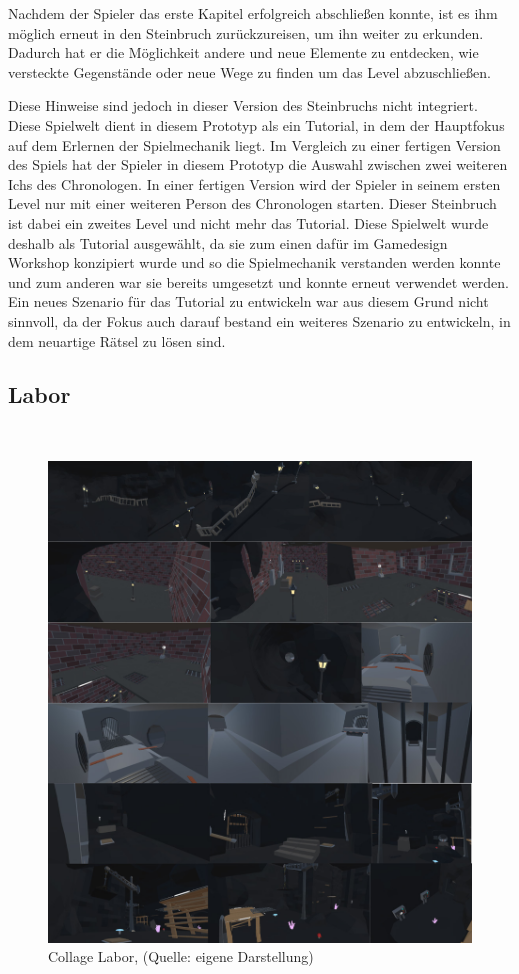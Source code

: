 Nachdem der Spieler das erste Kapitel erfolgreich abschließen konnte, ist es ihm möglich erneut in den Steinbruch zurückzureisen, um ihn weiter zu erkunden. Dadurch hat er die Möglichkeit andere und neue Elemente zu entdecken, wie   versteckte Gegenstände oder neue Wege zu finden um das Level abzuschließen.

Diese Hinweise sind jedoch in dieser Version des Steinbruchs nicht integriert. Diese Spielwelt dient in diesem Prototyp als ein Tutorial, in dem der Hauptfokus auf dem Erlernen der Spielmechanik liegt. Im Vergleich zu einer fertigen Version des Spiels hat der Spieler in diesem Prototyp die Auswahl zwischen zwei weiteren Ichs des Chronologen. In einer fertigen Version wird der Spieler in seinem ersten Level nur mit einer weiteren Person des Chronologen starten. Dieser Steinbruch ist dabei ein zweites Level und nicht mehr das Tutorial. Diese Spielwelt wurde deshalb als Tutorial ausgewählt, da sie zum einen dafür im Gamedesign Workshop konzipiert wurde und so die Spielmechanik verstanden werden konnte und zum anderen war sie bereits umgesetzt und konnte erneut verwendet werden. Ein neues Szenario für das Tutorial zu entwickeln war aus diesem Grund nicht sinnvoll, da der Fokus auch darauf bestand ein weiteres Szenario zu entwickeln, in dem neuartige Rätsel zu lösen sind.
\newpage
\subsection{Labor}
~
\begin{figure}[ht]
\centering
\includegraphics[width=1\linewidth]{content/pictures/Labor - A Fraction of Time.jpg}
\caption{Collage Labor, (Quelle: eigene Darstellung)}
\label{fig:collage_labor}
\end{figure}

